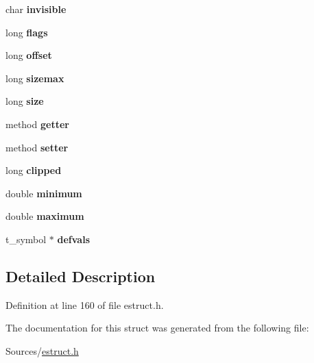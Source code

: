 \begin{DoxyCompactItemize}
\item 
\hypertarget{struct__eattr_a8cde8e3b0a36a73a41b56efcf538c2b6}{char {\bfseries invisible}}\label{struct__eattr_a8cde8e3b0a36a73a41b56efcf538c2b6}

\item 
\hypertarget{struct__eattr_a6a36e81b5744ff152979cae202d37e78}{long {\bfseries flags}}\label{struct__eattr_a6a36e81b5744ff152979cae202d37e78}

\item 
\hypertarget{struct__eattr_adcce6ee751c1469525aec834a4d37ea8}{long {\bfseries offset}}\label{struct__eattr_adcce6ee751c1469525aec834a4d37ea8}

\item 
\hypertarget{struct__eattr_add689f41a580354ce736986eb6dbafe4}{long {\bfseries sizemax}}\label{struct__eattr_add689f41a580354ce736986eb6dbafe4}

\item 
\hypertarget{struct__eattr_a37363161b41c4165b98cba7abc7a9d95}{long {\bfseries size}}\label{struct__eattr_a37363161b41c4165b98cba7abc7a9d95}

\item 
\hypertarget{struct__eattr_a356a5777ae542bd1da7749b82c7e4f3b}{method {\bfseries getter}}\label{struct__eattr_a356a5777ae542bd1da7749b82c7e4f3b}

\item 
\hypertarget{struct__eattr_af492684e247b25cfd1c14acc19a68fe6}{method {\bfseries setter}}\label{struct__eattr_af492684e247b25cfd1c14acc19a68fe6}

\item 
\hypertarget{struct__eattr_a631f53ecc3ce73c55ece3cec75708bcc}{long {\bfseries clipped}}\label{struct__eattr_a631f53ecc3ce73c55ece3cec75708bcc}

\item 
\hypertarget{struct__eattr_a4510e71778a7b0d3a4be9caaa8410a95}{double {\bfseries minimum}}\label{struct__eattr_a4510e71778a7b0d3a4be9caaa8410a95}

\item 
\hypertarget{struct__eattr_a26e8b97fa5003d22d7463f38699c669a}{double {\bfseries maximum}}\label{struct__eattr_a26e8b97fa5003d22d7463f38699c669a}

\item 
\hypertarget{struct__eattr_a924d892a1bc151dc21e9b93a5ff7f6fb}{t\-\_\-symbol $\ast$ {\bfseries defvals}}\label{struct__eattr_a924d892a1bc151dc21e9b93a5ff7f6fb}

\end{DoxyCompactItemize}


\subsection{Detailed Description}


Definition at line 160 of file estruct.\-h.



The documentation for this struct was generated from the following file\-:\begin{DoxyCompactItemize}
\item 
Sources/\hyperlink{estruct_8h}{estruct.\-h}\end{DoxyCompactItemize}
